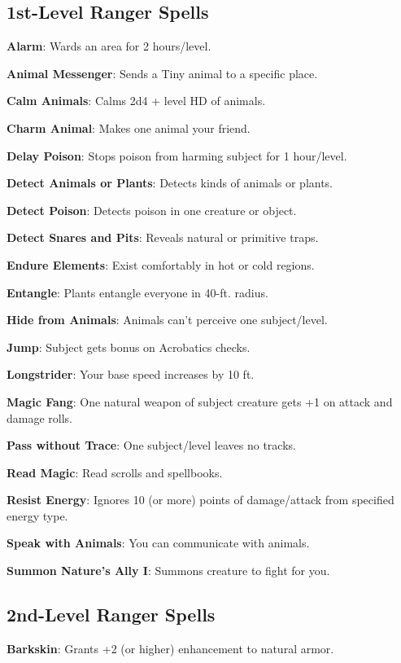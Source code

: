 \subsection{1st-Level Ranger Spells}


\textbf{Alarm}: Wards an area for 2 hours/level.

\textbf{Animal Messenger}: Sends a Tiny animal to a specific place.

\textbf{Calm Animals}: Calms 2d4 + level HD of animals.

\textbf{Charm Animal}: Makes one animal your friend.

\textbf{Delay Poison}: Stops poison from harming subject for 1 hour/level.

\textbf{Detect Animals or Plants}: Detects kinds of animals or plants.

\textbf{Detect Poison}: Detects poison in one creature or object.

\textbf{Detect Snares and Pits}: Reveals natural or primitive traps.

\textbf{Endure Elements}: Exist comfortably in hot or cold regions.

\textbf{Entangle}: Plants entangle everyone in 40-ft. radius.

\textbf{Hide from Animals}: Animals can't perceive one subject/level.

\textbf{Jump}: Subject gets bonus on Acrobatics checks.

\textbf{Longstrider}: Your base speed increases by 10 ft.

\textbf{Magic Fang}: One natural weapon of subject creature gets +1 on attack and damage rolls.

\textbf{Pass without Trace}: One subject/level leaves no tracks.

\textbf{Read Magic}: Read scrolls and spellbooks.

\textbf{Resist Energy}: Ignores 10 (or more) points of damage/attack from specified energy type.

\textbf{Speak with Animals}: You can communicate with animals.

\textbf{Summon Nature's Ally I}: Summons creature to fight for you.

\subsection{2nd-Level Ranger Spells}


\textbf{Barkskin}: Grants +2 (or higher) enhancement to natural armor.

